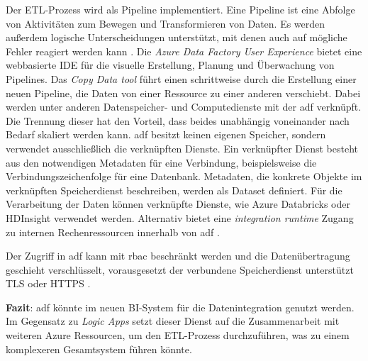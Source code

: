 Der ETL-Prozess wird als Pipeline implementiert. Eine Pipeline ist eine Abfolge von Aktivitäten zum Bewegen und Transformieren von Daten. Es werden außerdem logische Unterscheidungen unterstützt, mit denen auch auf mögliche Fehler reagiert werden kann \cite{zhu_pipeline_2021}. Die \textit{Azure Data Factory User Experience} bietet eine webbasierte IDE für die visuelle Erstellung, Planung und Überwachung von Pipelines. Das \textit{Copy Data tool} führt einen schrittweise durch die Erstellung einer neuen Pipeline, die Daten von einer Ressource zu einer anderen verschiebt. Dabei werden unter anderen Datenspeicher- und Computedienste mit der \ac{adf} verknüpft. Die Trennung dieser hat den Vorteil, dass beides unabhängig voneinander nach Bedarf skaliert werden kann. \ac{adf} besitzt keinen eigenen Speicher, sondern verwendet ausschließlich die verknüpften Dienste. Ein verknüpfter Dienst besteht aus den notwendigen Metadaten für eine Verbindung, beispielsweise die Verbindungszeichenfolge für eine Datenbank. Metadaten, die konkrete Objekte im verknüpften Speicherdienst beschreiben, werden als Dataset definiert. Für die Verarbeitung der Daten können verknüpfte Dienste, wie Azure Databricks oder HDInsight verwendet werden. Alternativ bietet eine \textit{integration runtime} Zugang zu internen Rechenressourcen innerhalb von \ac{adf} \cite{swinbank_your_2021}.

Der Zugriff in \ac{adf} kann mit \ac{rbac} beschränkt werden \cite{sabat_security_2021} und die Datenübertragung geschieht verschlüsselt, vorausgesetzt der verbundene Speicherdienst unterstützt TLS oder HTTPS \cite{baldwin_azure_adf_2021}.

\textbf{Fazit}: \ac{adf} könnte im neuen BI-System für die Datenintegration genutzt werden. Im Gegensatz zu \textit{Logic Apps} setzt dieser Dienst auf die Zusammenarbeit mit weiteren Azure Ressourcen, um den ETL-Prozess durchzuführen, was zu einem komplexeren Gesamtsystem führen könnte.



